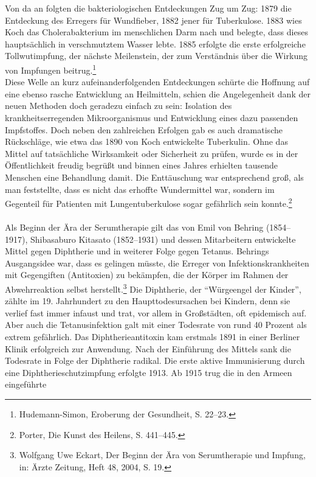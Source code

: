 \documentclass[
    a4paper,
    12pt,
    hyphens,
    chapterprefix=true,
    headheight=33pt,
    footheight=29pt,
    headings=optiontohead, %
]{scrartcl}
\begin{document}
Von da an folgten die bakteriologischen Entdeckungen Zug um Zug: 1879 die Entdeckung des Erregers für Wundfieber, 1882 jener für Tuberkulose. 1883 wies Koch das Cholerabakterium im menschlichen Darm nach und belegte, dass dieses hauptsächlich in verschmutztem Wasser lebte. 1885 erfolgte die erste erfolgreiche Tollwutimpfung, der nächste Meilenstein, der zum Verständnis über die Wirkung von Impfungen beitrug.\footnote{Hudemann-Simon, Eroberung der Gesundheit, S. 22--23.}\\
Diese Welle an kurz aufeinanderfolgenden Entdeckungen schürte die Hoffnung auf eine ebenso rasche Entwicklung an Heilmitteln, schien die Angelegenheit dank der neuen Methoden doch geradezu einfach zu sein: Isolation des krankheitserregenden Mikroorganismus und Entwicklung eines dazu passenden Impfstoffes. Doch neben den zahlreichen Erfolgen gab es auch dramatische Rückschläge, wie etwa das 1890 von Koch entwickelte Tuberkulin. Ohne das Mittel auf tatsächliche Wirksamkeit oder Sicherheit zu prüfen, wurde es in der Öffentlichkeit freudig begrüßt und binnen eines Jahres erhielten tausende Menschen eine Behandlung damit. Die Enttäuschung war entsprechend groß, als man feststellte, dass es nicht das erhoffte Wundermittel war, sondern im Gegenteil für Patienten mit Lungentuberkulose sogar gefährlich sein konnte.\footnote{Porter, Die Kunst des Heilens, S. 441--445.}\\
\\
Als Beginn der Ära der Serumtherapie gilt das von Emil von Behring (1854--1917), Shibasaburo Kitasato (1852--1931) und 
dessen Mitarbeitern entwickelte Mittel gegen Diphtherie und in weiterer Folge gegen Tetanus. Behrings Ausgangsidee war, 
dass es gelingen müsste, die Erreger von Infektionskrankheiten mit Gegengiften (Antitoxien) zu bekämpfen, die der Körper 
im Rahmen der Abwehrreaktion selbst herstellt.\footnote{Wolfgang Uwe Eckart, Der Beginn der Ära von Serumtherapie und Impfung, 
in: Ärzte Zeitung, Heft 48, 2004, S. 19.} Die Diphtherie, der "`Würgeengel der Kinder"', zählte im 19. Jahrhundert zu den Haupttodesursachen 
bei Kindern, denn sie verlief fast immer infaust und trat, vor allem in Großstädten, oft epidemisch auf. 
Aber auch die Tetanusinfektion galt mit einer Todesrate von rund 40 Prozent 
als extrem gefährlich. Das Diphtherieantitoxin kam erstmals 1891 in einer Berliner Klinik erfolgreich zur Anwendung. 
Nach der Einführung des Mittels sank die Todesrate in Folge der Diphtherie radikal. 
Die erste aktive Immunisierung durch eine Diphtherieschutzimpfung erfolgte 1913. Ab 1915 trug die in den Armeen eingeführte 
\end{document}
